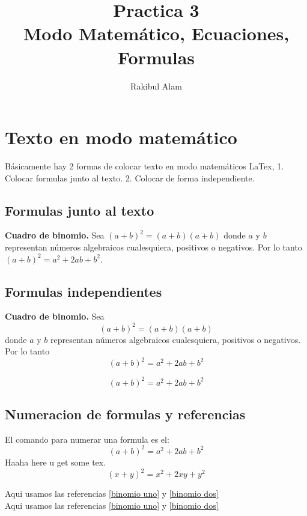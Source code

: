 \documentclass[12pt]{article}
\begin{document}
\title{Practica 3 \\ Modo Matemático, Ecuaciones, Formulas}
\author{Rakibul Alam}
\date{}
\maketitle
\tableofcontents

\section{Texto en modo matemático}
Básicamente hay 2 formas de colocar texto en modo matemáticos               
LaTex, 1. Colocar formulas junto al texto. 2. Colocar de forma independiente. 

\subsection{Formulas junto al texto}
\textbf{Cuadro de binomio.} Sea $ (a+b)^{2} = (a+b) (a+b) $ donde $a$ y $b$ representan números algebraicos cualesquiera, positivos o negativos. Por lo tanto $ (a+b)^{2} = a^{2} + 2ab + b^{2} $.  

\subsection{Formulas independientes}

\textbf{Cuadro de binomio.} Sea 
\[
(a+b)^{2} = (a+b) (a+b)
\]
donde $a$ y $b$ representan números algebraicos cualesquiera, positivos o negativos. Por lo tanto 
\[
(a+b)^{2} = a^{2} + 2ab + b^{2} 
\]

\begin{equation*}
(a+b)^{2} = a^{2} + 2ab + b^{2}
\end{equation*}

\subsection{Numeracion de formulas y referencias}
El comando para numerar una formula es el: 
\begin{equation}\label{binomio uno}
(a+b)^{2} = a^{2} + 2ab + b^{2}
\end{equation}
Haaha here u get some tex. 
\begin{equation}\label{binomio dos}
(x+y)^{2} = x^{2} + 2xy + y^{2}
\end{equation}

Aqui usamos las referencias \ref{binomio uno} y \ref{binomio dos} \\
Aqui usamos las referencias \eqref{binomio uno} y \eqref{binomio dos}
\end{document}
